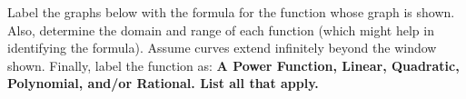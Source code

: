 \documentclass{ximera}
\begin{document}
\begin{exercise}
 Label the graphs below with the formula for the function whose graph is shown. Also, determine the domain and range of each function (which might help in identifying the formula). Assume curves extend infinitely beyond the window shown. Finally, label the function as: \textbf{A Power Function, Linear, Quadratic, Polynomial, and/or Rational. List all that apply.}


\end{exercise}
\end{document}
